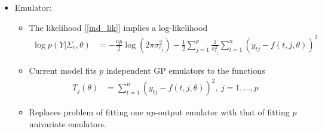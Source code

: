\documentclass[12pt]{article}
\begin{document}
\begin{itemize}
\item Emulator:
	\begin{itemize}
	\item The likelihood [\ref{ind_lik}] implies a log-likelihood
	\begin{align}
	\log p(Y|\Sigma_\epsilon, \theta) &= -\frac{np}{2} \log(2\pi \sigma^2_{\epsilon_j}) - \frac{1}{2} \sum_{j = 1}^{p} \frac{1}{\sigma^2_{\epsilon_j}} \sum_{t = 1}^{n} (y_{tj} - f(t, j, \theta))^2
	\end{align}
	\item Current model fits $p$ independent GP emulators to the functions
	\begin{align}
	T_j(\theta) &= \sum_{t = 1}^{n} (y_{tj} - f(t, j, \theta))^2, \ j = 1, \dots, p
	\end{align} 
	\item Replaces problem of fitting one $np$-output emulator with that of fitting $p$ univariate emulators. 
	\end{itemize}
\end{itemize}
\end{document}
